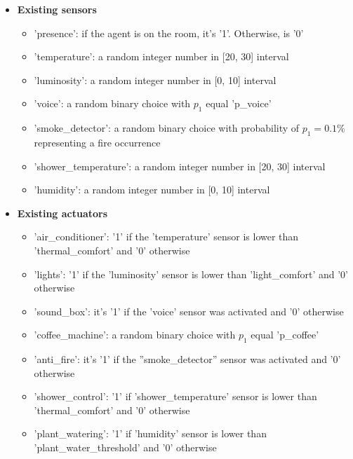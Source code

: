 \begin{itemize}
    \item \textbf{Existing sensors}
        \begin{itemize}
            \item  'presence': if the agent is on the room, it's '1'. Otherwise, is '0'
            \item  'temperature': a random integer number in [20, 30] interval
            \item  'luminosity': a random integer number in [0, 10] interval
            \item  'voice': a random binary choice with $p_1$ equal 'p\_voice'
            \item 'smoke\_detector': a random binary choice with probability of $p_1 = 0.1\%$ representing a fire occurrence
            \item 'shower\_temperature': a random integer number in [20, 30] interval
            \item 'humidity': a random integer number in [0, 10] interval
        \end{itemize}
    \item \textbf{Existing actuators}
        \begin{itemize}
            \item  'air\_conditioner': '1' if the 'temperature' sensor is lower than 'thermal\_comfort' and '0' otherwise 
            \item  'lights': '1' if the 'luminosity' sensor is lower than 'light\_comfort' and '0' otherwise   
            \item  'sound\_box': it's '1' if the 'voice' sensor was activated and '0' otherwise 
            \item 'coffee\_machine': a random binary choice with $p_1$ equal 'p\_coffee'
            \item 'anti\_fire': it's '1' if the ''smoke\_detector'' sensor was activated and '0' otherwise
            \item 'shower\_control': '1' if 'shower\_temperature' sensor is lower than 'thermal\_comfort' and '0' otherwise 
            \item 'plant\_watering': '1' if 'humidity' sensor is lower than 'plant\_water\_threshold' and '0' otherwise 
        \end{itemize}
\end{itemize}

